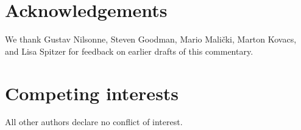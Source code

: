 \documentclass[authordate, meta, issue]{jote-new-article}
\begin{document}
\section{Acknowledgements}



We thank Gustav Nilsonne, Steven Goodman, Mario Malički, Marton Kovacs, and Lisa Spitzer for feedback on earlier drafts of this commentary.







\section{Competing interests}



All other authors declare no conflict of interest.




\nocite{*}


\printbibliography
\end{document}
